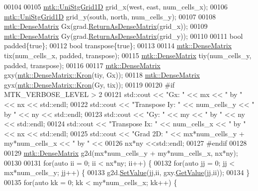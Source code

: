 \begin{DoxyCode}
00104 
00105   \hyperlink{classmtk_1_1UniStgGrid1D}{mtk::UniStgGrid1D} grid\_x(west, east, num\_cells\_x);
00106   \hyperlink{classmtk_1_1UniStgGrid1D}{mtk::UniStgGrid1D} grid\_y(south, north, num\_cells\_y);
00107 
00108   \hyperlink{classmtk_1_1DenseMatrix}{mtk::DenseMatrix} Gx(grad.\hyperlink{classmtk_1_1Grad1D_a77b2eddbe4ab03f469306c604d505b1a}{ReturnAsDenseMatrix}(grid\_x));
00109   \hyperlink{classmtk_1_1DenseMatrix}{mtk::DenseMatrix} Gy(grad.\hyperlink{classmtk_1_1Grad1D_a77b2eddbe4ab03f469306c604d505b1a}{ReturnAsDenseMatrix}(grid\_y));
00110 
00111   \textcolor{keywordtype}{bool} padded\{\textcolor{keyword}{true}\};
00112   \textcolor{keywordtype}{bool} transpose\{\textcolor{keyword}{true}\};
00113 
00114   \hyperlink{classmtk_1_1DenseMatrix}{mtk::DenseMatrix} tix(num\_cells\_x, padded, transpose);
00115   \hyperlink{classmtk_1_1DenseMatrix}{mtk::DenseMatrix} tiy(num\_cells\_y, padded, transpose);
00116 
00117   \hyperlink{classmtk_1_1DenseMatrix}{mtk::DenseMatrix} gxy(\hyperlink{classmtk_1_1DenseMatrix_a01d3d8bd502870f93bf3a88a0cc5fb49}{mtk::DenseMatrix::Kron}(tiy, Gx));
00118   \hyperlink{classmtk_1_1DenseMatrix}{mtk::DenseMatrix} gyx(\hyperlink{classmtk_1_1DenseMatrix_a01d3d8bd502870f93bf3a88a0cc5fb49}{mtk::DenseMatrix::Kron}(Gy, tix));
00119 
00120 \textcolor{preprocessor}{  #if MTK\_VERBOSE\_LEVEL > 2}
00121   std::cout << \textcolor{stringliteral}{"Gx: "} << mx << \textcolor{stringliteral}{" by "} << nx << std::endl;
00122   std::cout << \textcolor{stringliteral}{"Transpose Iy: "} << num\_cells\_y << \textcolor{stringliteral}{" by "} << ny  << std::endl;
00123   std::cout << \textcolor{stringliteral}{"Gy: "} << my << \textcolor{stringliteral}{" by "} << ny << std::endl;
00124   std::cout << \textcolor{stringliteral}{"Transpose Ix: "} << num\_cells\_x << \textcolor{stringliteral}{" by "} << nx  << std::endl;
00125   std::cout << \textcolor{stringliteral}{"Grad 2D: "} << mx*num\_cells\_y + my*num\_cells\_x << \textcolor{stringliteral}{" by "} <<
00126     nx*ny <<std::endl;
00127 \textcolor{preprocessor}{  #endif}
00128 
00129   \hyperlink{classmtk_1_1DenseMatrix}{mtk::DenseMatrix} g2d(mx*num\_cells\_y + my*num\_cells\_x, nx*ny);
00130 
00131   \textcolor{keywordflow}{for}(\textcolor{keyword}{auto} ii = 0; ii < nx*ny; ii++) \{
00132     \textcolor{keywordflow}{for}(\textcolor{keyword}{auto} jj = 0; jj < mx*num\_cells\_y; jj++) \{
00133       g2d.\hyperlink{classmtk_1_1DenseMatrix_a784ce5784109ac86bfb9d8562b334b13}{SetValue}(jj,ii, gxy.\hyperlink{classmtk_1_1DenseMatrix_a4b23ecbebd970b5eea915dbb50691024}{GetValue}(jj,ii));
00134     \}
00135     \textcolor{keywordflow}{for}(\textcolor{keyword}{auto} kk = 0; kk < my*num\_cells\_x; kk++) \{

\end{DoxyCode}
